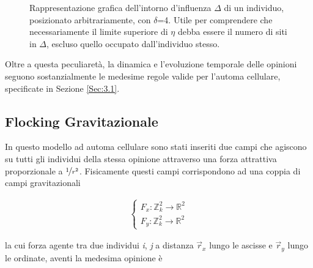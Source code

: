 \documentclass[letterpaper,10pt]{article}
\begin{document}
\begin{figure}[h]
\centering
{}
\caption{Rappresentazione grafica dell'intorno d'influenza $\Delta$ di un individuo, posizionato arbitrariamente, con $\delta$=4. Utile per comprendere che necessariamente il limite superiore di $\eta$ debba essere il numero di siti in $\Delta$, escluso quello occupato dall'individuo stesso.}
\label{Fig:6}
\end{figure}

Oltre a questa peculiaretà, la dinamica e l'evoluzione temporale delle opinioni seguono sostanzialmente le medesime regole valide per l'automa cellulare, specificate in Sezione \ref{Sec:3.1}.


\subsection{Flocking Gravitazionale}
\label{Sec:3.3}

In questo modello ad automa cellulare sono stati inseriti due campi che agiscono su tutti gli individui della stessa opinione attraverso una forza attrattiva proporzionale a $\nicefrac{1}{r^2}$. Fisicamente questi campi corrispondono ad una coppia di campi gravitazionali

\begin{equation}
\begin{aligned}
\begin{cases}
F_x:  \mathbb{Z}^2_k \rightarrow \mathbb{R}^2 \\
F_y:  \mathbb{Z}^2_k \rightarrow \mathbb{R}^2 
\end{cases}
\end{aligned}
\label{Eq:4}
\end{equation}

la cui forza agente tra due individui \textit{i}, \textit{j} a distanza $\vec{r}_{x}$ lungo le ascisse e $\vec{r}_{y}$ lungo le ordinate, aventi la medesima opinione è
\end{document}
